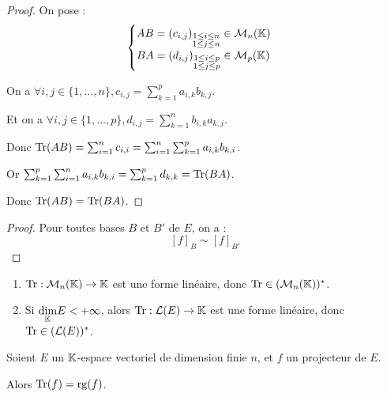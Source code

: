 \documentclass[12pt,a4paper]{report}
\begin{document}
\begin{proof}
    On pose :
    $$\begin{cases}
    AB = (c_{i,j})_{\substack{1 \le i \le n \\ 1 \le j \le n}} \in \mathcal M_n(\mathbb{K}) \\
    BA = (d_{i,j})_{\substack{1 \le i \le p \\ 1 \le j \le p}} \in \mathcal M_p(\mathbb{K})
    \end{cases}$$

    On a $\forall i,j \in \{1,\dots,n\}, c_{i,j} = \sum_{k=1}^p a_{i,k} b_{k,j}$.

    Et on a $\forall i,j \in \{1,\dots,p\}, d_{i,j} = \sum_{k=1}^n b_{i,k} a_{k,j}$.
    
    Donc $\mathrm{Tr}(AB) = \sum_{i=1}^n c_{i,i} = \sum_{i=1}^n \sum_{k=1}^p a_{i,k} b_{k,i}$.

    Or $\sum_{k=1}^p \sum_{i=1}^n a_{i,k} b_{k,i} = \sum_{k=1}^p d_{k,k} = \mathrm{Tr}(BA)$.

    Donc $\mathrm{Tr}(AB) = \mathrm{Tr}(BA)$.
\end{proof}

\begin{proof}
    Pour toutes bases $B$ et $B'$ de $E$, on a :
    $$[f]_B \sim [f]_{B'}$$
\end{proof}

\begin{property}
    \begin{enumerate}
        \item $\mathrm{Tr} : \mathcal M_n(\mathbb{K}) \to \mathbb{K}$ est une forme linéaire, donc $\mathrm{Tr} \in (\mathcal M_n(\mathbb{K}))^*$.
        \item Si $\underset{\mathbb{K}}\dim E < +\infty$, alors $\mathrm{Tr} : \mathcal L(E) \to \mathbb{K}$ est une forme linéaire, donc $\mathrm{Tr} \in (\mathcal L(E))^*$.
    \end{enumerate}
\end{property}

\begin{property}
    Soient $E$ un $\mathbb{K}$-espace vectoriel de dimension finie $n$, et $f$ un projecteur de $E$.

    Alors $\mathrm{Tr}(f) = \mathrm{rg}(f)$.
\end{property}
\end{document}
